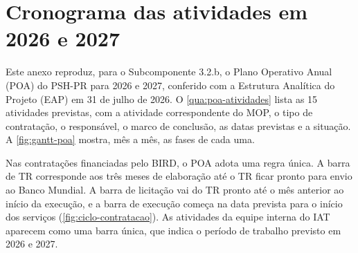 \chapter{Cronograma das atividades em 2026 e 2027}
\label{an:cronograma}

Este anexo reproduz, para o Subcomponente 3.2.b, o Plano Operativo Anual
(POA) do PSH-PR para 2026 e 2027, conferido com a Estrutura Analítica do
Projeto (EAP) em 31 de julho de 2026. O \autoref{qua:poa-atividades} lista as
15 atividades previstas, com a atividade correspondente do MOP, o tipo de
contratação, o responsável, o marco de conclusão, as datas previstas e a
situação. A \autoref{fig:gantt-poa} mostra, mês a mês, as fases de cada uma.

Nas contratações financiadas pelo BIRD, o POA adota uma regra única. A barra
de TR corresponde aos três meses de elaboração até o TR ficar pronto para
envio ao Banco Mundial. A barra de licitação vai do TR pronto até o mês
anterior ao início da execução, e a barra de execução começa na data prevista
para o início dos serviços (\autoref{fig:ciclo-contratacao}). As atividades
da equipe interna do IAT aparecem como uma barra única, que indica o período
de trabalho previsto em 2026 e 2027.


